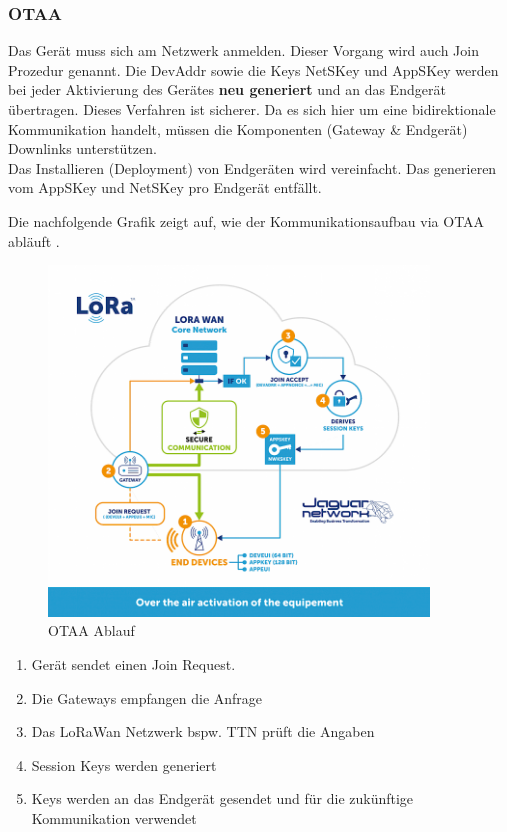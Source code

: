 \documentclass[11pt,english,german]{report}
\theoremstyle{definition}
\begin{document}
\subsubsection{OTAA}
Das Gerät muss sich am Netzwerk anmelden. Dieser Vorgang wird auch Join Prozedur genannt. Die DevAddr sowie die Keys NetSKey und AppSKey werden bei jeder Aktivierung des Gerätes \textbf{neu generiert} und an das Endgerät übertragen. Dieses Verfahren ist sicherer. Da es sich hier um eine bidirektionale Kommunikation handelt, müssen die Komponenten (Gateway \& Endgerät) Downlinks unterstützen.\\[0.3cm]
Das Installieren (Deployment) von Endgeräten wird vereinfacht. Das generieren vom AppSKey und NetSKey pro Endgerät entfällt. 

\newpage
\noindent
Die nachfolgende Grafik zeigt auf, wie der Kommunikationsaufbau via OTAA abläuft \cite{jaguar}.
\begin{figure}[H]
	\centering
	\includegraphics[width=0.9\textwidth]{img/otaa_schema.png}
	\caption[OTAA Ablauf]
	{OTAA Ablauf}
\end{figure}

\begin{enumerate}
	\item Gerät sendet einen Join Request.
	\item Die Gateways empfangen die Anfrage
	\item Das LoRaWan Netzwerk  bspw. TTN prüft die Angaben
	\item Session Keys werden generiert
	\item Keys werden an das Endgerät gesendet und für die zukünftige Kommunikation verwendet
\end{enumerate}
\end{document}
